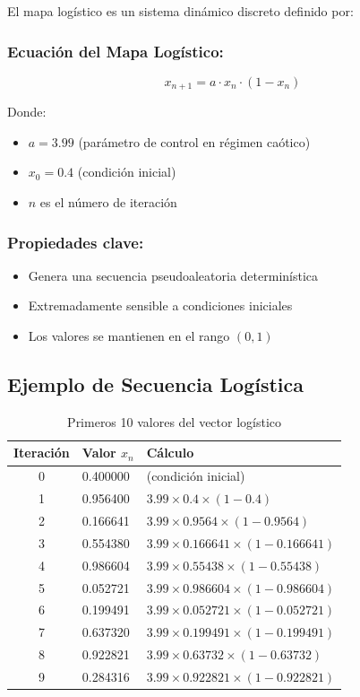 \documentclass[12pt,a4paper]{article}
\begin{document}
El mapa logístico es un sistema dinámico discreto definido por:

\subsubsection*{Ecuación del Mapa Logístico:}
\begin{equation}
x_{n+1} = a \cdot x_n \cdot (1 - x_n)
\label{eq:logistic}
\end{equation}

Donde:
\begin{itemize}
    \item $a = 3.99$ (parámetro de control en régimen caótico)
    \item $x_0 = 0.4$ (condición inicial)
    \item $n$ es el número de iteración
\end{itemize}

\subsubsection*{Propiedades clave:}
\begin{itemize}
    \item Genera una secuencia pseudoaleatoria determinística
    \item Extremadamente sensible a condiciones iniciales
    \item Los valores se mantienen en el rango $(0, 1)$
\end{itemize}

\subsection{Ejemplo de Secuencia Logística}

\begin{table}[H]
\centering
\caption{Primeros 10 valores del vector logístico}
\label{tab:logistic}
\begin{tabular}{@{}cll@{}}
\toprule
\textbf{Iteración} & \textbf{Valor $x_n$} & \textbf{Cálculo} \\ \midrule
0 & 0.400000 & (condición inicial) \\
1 & 0.956400 & $3.99 \times 0.4 \times (1 - 0.4)$ \\
2 & 0.166641 & $3.99 \times 0.9564 \times (1 - 0.9564)$ \\
3 & 0.554380 & $3.99 \times 0.166641 \times (1 - 0.166641)$ \\
4 & 0.986604 & $3.99 \times 0.55438 \times (1 - 0.55438)$ \\
5 & 0.052721 & $3.99 \times 0.986604 \times (1 - 0.986604)$ \\
6 & 0.199491 & $3.99 \times 0.052721 \times (1 - 0.052721)$ \\
7 & 0.637320 & $3.99 \times 0.199491 \times (1 - 0.199491)$ \\
8 & 0.922821 & $3.99 \times 0.63732 \times (1 - 0.63732)$ \\
9 & 0.284316 & $3.99 \times 0.922821 \times (1 - 0.922821)$ \\ \bottomrule
\end{tabular}
\end{table}
\end{document}
